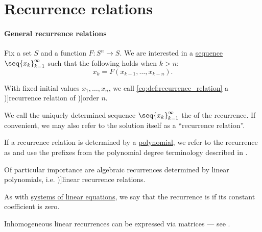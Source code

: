 \section{Recurrence relations}\label{sec:recurrence_relations}

\paragraph{General recurrence relations}

\begin{definition}\label{def:recurrence_relation}\mimprovised
  Fix a set \( S \) and a function \( F: S^n \to S \). We are interested in a \hyperref[def:sequence]{sequence} \( \seq{ x_k }_{k=1}^\infty \) such that the following holds when \( k > n \):
  \begin{equation}\label{eq:def:recurrence_relation}
    x_k = F(x_{k-1}, \ldots, x_{k-n}).
  \end{equation}

  With fixed initial values \( x_1, \ldots, x_n \), we call \eqref{eq:def:recurrence_relation} a \term[en=recurrence relation (\cite[def. 2.4.4]{Rosen2019DiscreteMathematics})]{recurrence relation} of \term[en=order (of linear recurring sequence) (\cite[395]{LidlNiederreiter1997FiniteFields})]{order} \( n \).

  \begin{thmenum}
     We call the uniquely determined sequence \( \seq{ x_k }_{k=1}^\infty \) the  of the recurrence. If convenient, we may also refer to the solution itself as a \enquote{recurrence relation}.

     If a recurrence relation is determined by a \hyperref[def:polynomial_algebra/polynomial]{polynomial}, we refer to the recurrence as  and use the prefixes from the polynomial degree terminology described in .

     Of particular importance are algebraic recurrences determined by linear polynomials, i.e. \term[en=linear recurring sequence (\cite[395]{LidlNiederreiter1997FiniteFields})]{linear recurrence relations}.

    As with \hyperref[rem:system_of_equations]{systems of linear equations}, we say that the recurrence is  if its constant coefficient is zero.

    Inhomogeneous linear recurrences can be expressed via matrices --- see .
  \end{thmenum}
\end{definition}
